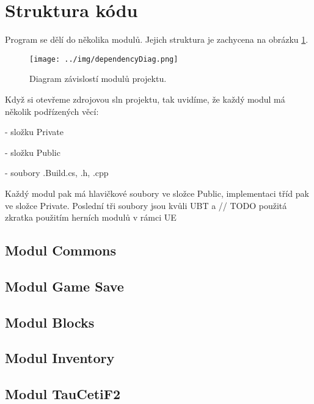 
\section{Struktura kódu}

Program se dělí do několika modulů. Jejich struktura je zachycena na obrázku \ref{fig:obrStruktura_DependencyDiag}.

\begin{figure}[h!]\centering
\texttt{[image: ../img/dependencyDiag.png]}

\caption{Diagram závislostí modulů projektu.}
\label{fig:obrStruktura_DependencyDiag}

\end{figure}

Když si otevřeme zdrojovou sln projektu, tak uvidíme, že každý modul má několik podřízených věcí: 

- složku Private

- složku Public

- soubory .Build.cs, .h, .cpp

Každý modul pak má hlavičkové soubory ve složce Public, implementaci tříd pak ve složce Private. Poslední tři soubory jsou kvůli UBT a // TODO použitá zkratka 
použitím herních modulů v rámci UE



\subsection{Modul Commons}



\subsection{Modul Game Save}



\subsection{Modul Blocks}



\subsection{Modul Inventory}



\subsection{Modul TauCetiF2}




